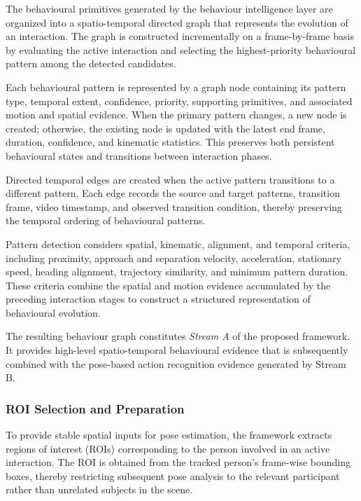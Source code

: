\documentclass[runningheads]{llncs}
\begin{document}
The behavioural primitives generated by the behaviour intelligence layer are
organized into a spatio-temporal directed graph that represents the evolution
of an interaction. The graph is constructed incrementally on a frame-by-frame
basis by evaluating the active interaction and selecting the highest-priority
behavioural pattern among the detected candidates.

Each behavioural pattern is represented by a graph node containing its
pattern type, temporal extent, confidence, priority, supporting primitives,
and associated motion and spatial evidence. When the primary pattern changes,
a new node is created; otherwise, the existing node is updated with the latest
end frame, duration, confidence, and kinematic statistics. This preserves both
persistent behavioural states and transitions between interaction phases.

Directed temporal edges are created when the active pattern transitions to a
different pattern. Each edge records the source and target patterns, transition
frame, video timestamp, and observed transition condition, thereby preserving
the temporal ordering of behavioural patterns.

Pattern detection considers spatial, kinematic, alignment, and temporal
criteria, including proximity, approach and separation velocity,
acceleration, stationary speed, heading alignment, trajectory similarity,
and minimum pattern duration. These criteria combine the spatial and motion
evidence accumulated by the preceding interaction stages to construct a
structured representation of behavioural evolution.

The resulting behaviour graph constitutes \textit{Stream A} of the
proposed framework. It provides high-level spatio-temporal behavioural
evidence that is subsequently combined with the pose-based action
recognition evidence generated by Stream B.

\subsubsection{ROI Selection and Preparation}

To provide stable spatial inputs for pose estimation, the framework extracts
regions of interest (ROIs) corresponding to the person involved in an active
interaction. The ROI is obtained from the tracked person's frame-wise
bounding boxes, thereby restricting subsequent pose analysis to the relevant
participant rather than unrelated subjects in the scene.
\end{document}
